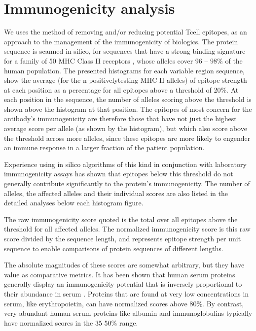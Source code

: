 \documentclass[letterpaper,10pt,english]{jupyterBook}
\begin{document}
\chapter{Immunogenicity analysis}
\label{\detokenize{ipynb/chapter4:immunogenicity-analysis}}\label{\detokenize{ipynb/chapter4::doc}}
\sphinxAtStartPar
We uses the method of removing and/or reducing potential T\sphinxhyphen{}cell epitopes, as an approach to the management of the immunogenicity of biologics. The protein sequence is scanned in silico, for sequences that have a strong binding signature for a family of 50 MHC Class II receptors , whose alleles cover 96 – 98\% of the human population. The presented histograms for each variable region sequence, show the average (for the n positively\sphinxhyphen{}testing MHC II alleles) of epitope strength at each position as a percentage for all epitopes above a threshold of 20\%. At each position in the sequence, the number of alleles scoring above the threshold is shown above the histogram at that position. The epitopes of most concern for the antibody’s immunogenicity are therefore those that have not just the highest average score per allele (as shown by the histogram), but which also score above the threshold across more alleles, since these epitopes are more likely to engender an immune response in a larger fraction of the patient population.

\sphinxAtStartPar
Experience using in silico algorithms of this kind in conjunction with laboratory immunogenicity assays has shown that epitopes below this threshold do not generally contribute significantly to the protein’s immunogenicity. The number of alleles, the affected alleles and their individual scores are also listed in the detailed analyses below each histogram figure.

\sphinxAtStartPar
The raw immunogenicity score quoted is the total over all epitopes above the threshold for all affected alleles. The normalized immunogenicity score is this raw score divided by the sequence length, and represents epitope strength per unit sequence to enable comparisons of protein sequences of different lengths.

\sphinxAtStartPar
The absolute magnitudes of these scores are somewhat arbitrary, but they have value as comparative metrics. It has been shown that human serum proteins generally display an immunogenicity potential that is inversely proportional to their abundance in serum . Proteins that are found at very low concentrations in serum, like erythropoietin, can have normalized scores above 80\%. By contrast, very abundant human serum proteins like albumin and immunoglobulins typically have normalized scores in the 35 \sphinxhyphen{} 50\% range.
\end{document}
